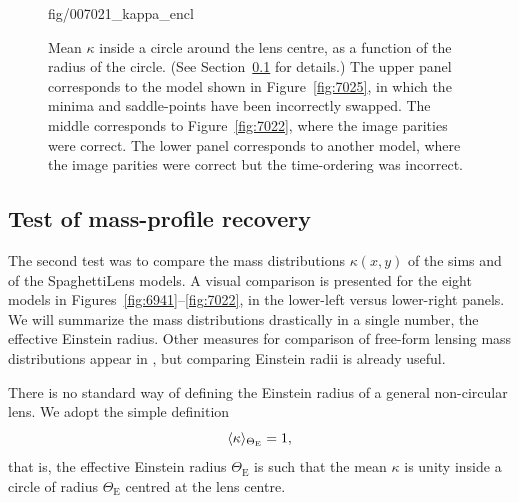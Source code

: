 \documentclass[usenatbib]{mn2e}
\newcommand{\spl}{SpaghettiLens\xspace}
\newcommand{\ERf}[1][]{$\Theta_\text{E#1}$\xspace} %
\newcommand{\figref}[1]{Figure~\ref{fig:#1}}
\newcommand{\secref}[1]{Section~\ref{sec:#1}}
\begin{document}
\begin{figure}
{             {fig/007021_kappa_encl}} \\
  \caption{Mean $\kappa$ inside a circle around the lens centre, as a
    function of the radius of the circle.  (See \secref{tests.t2} for
    details.) The upper panel corresponds to the model shown in
    \figref{7025}, in which the minima and saddle-points have been
    incorrectly swapped.  The middle corresponds to \figref{7022},
    where the image parities were correct.  The lower panel
    corresponds to another model, where the image parities were
    correct but the time-ordering was incorrect.}
\label{fig:kapenc_compare_faulty}
\end{figure}



\subsection{Test of mass-profile recovery} \label{sec:tests.t2}

The second test was to compare the mass distributions $\kappa(x,y)$ of
the sims and of the \spl models.  A visual comparison is presented for
the eight models in Figures~\ref{fig:6941}--\ref{fig:7022}, in the
lower-left versus lower-right panels.  We will summarize the mass
distributions drastically in a single number, the effective Einstein
radius.  Other measures for comparison of free-form lensing mass
distributions appear in \cite{2014arXiv1401.7990C}, but comparing
Einstein radii is already useful.

There is no standard way of defining the Einstein radius of a general
non-circular lens.  We adopt the simple definition
\begin{equation} \label{eq:effRE}
 \langle\kappa\rangle_{\Theta_{\rm E}} = 1,
\end{equation}
that is, the effective Einstein radius \ERf is such that the
mean $\kappa$ is unity inside a circle of radius \ERf centred at
the lens centre.
\end{document}
